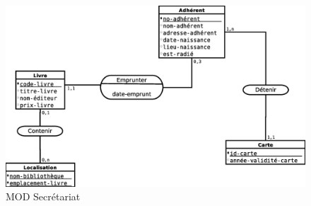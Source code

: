 \begin{figure}[!htb]
    \begin{center}
    \includegraphics[width=11.5cm]{images/cc1_mod2.eps}
    \caption{\label{cc1_mod2} MOD Secrétariat}
    \end{center}
\end{figure}

